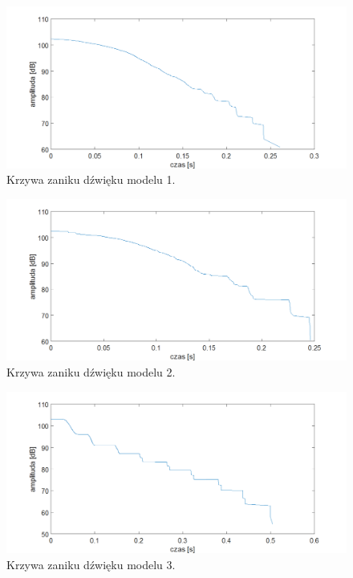 \begin{figure}[h]
        \centering
                \centering
                \includegraphics[width=16cm]{zanik1}
	\caption{Krzywa zaniku dźwięku modelu 1.}
\end{figure}

\begin{figure}[h]
        \centering
                \centering
                \includegraphics[width=16cm]{zanik2}
	\caption{Krzywa zaniku dźwięku modelu 2.}
\end{figure}

\begin{figure}[h]
        \centering
                \centering
                \includegraphics[width=16cm]{zanik3}
	\caption{Krzywa zaniku dźwięku modelu 3.}
\end{figure}


